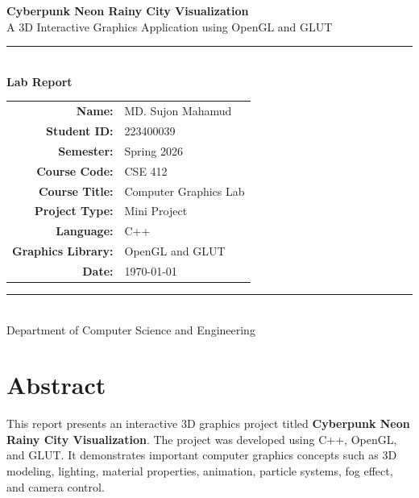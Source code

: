 \documentclass[12pt,a4paper]{report}
\begin{document}
\begin{titlepage}
    \centering
    \vspace*{1.8cm}

    {\Huge \textbf{Cyberpunk Neon Rainy City Visualization}}\\[0.5cm]
    {\Large A 3D Interactive Graphics Application using OpenGL and GLUT}\\[1.3cm]

    \rule{0.85\textwidth}{0.5pt}\\[0.8cm]

    {\Large \textbf{Lab Report}}\\[1.3cm]

    \begin{tabular}{rl}
        \textbf{Name:} & MD. Sujon Mahamud \\
        \textbf{Student ID:} & 223400039\\
        \textbf{Semester:} & Spring 2026 \\
        \textbf{Course Code:} & CSE 412 \\
        \textbf{Course Title:} & Computer Graphics Lab \\
        \textbf{Project Type:} & Mini Project \\
        \textbf{Language:} & C++ \\
        \textbf{Graphics Library:} & OpenGL and GLUT \\
        \textbf{Date:} & \today \\
    \end{tabular}

    \vfill
    \rule{0.85\textwidth}{0.5pt}\\[0.3cm]
    {\large Department of Computer Science and Engineering}
\end{titlepage}

\tableofcontents
\newpage

\chapter*{Abstract}

This report presents an interactive 3D graphics project titled \textbf{Cyberpunk Neon Rainy City Visualization}. The project was developed using C++, OpenGL, and GLUT. It demonstrates important computer graphics concepts such as 3D modeling, lighting, material properties, animation, particle systems, fog effect, and camera control.
\end{document}
